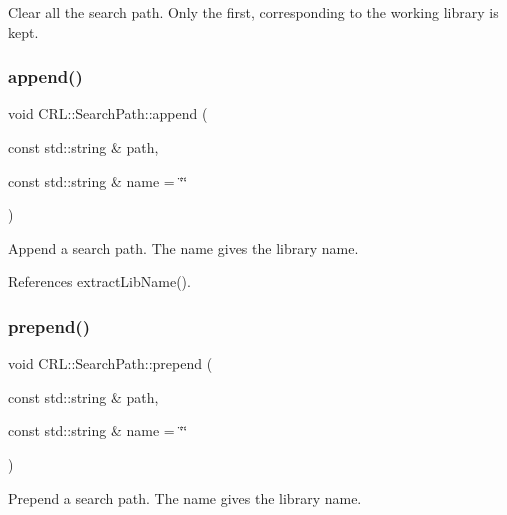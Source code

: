 Clear all the search path. Only the first, corresponding to the working library is kept. \mbox{\label{classCRL_1_1SearchPath_af358bdb1e940f08137f887f70eb641e3}} 
\subsubsection{\texorpdfstring{append()}{append()}}
{\footnotesize\ttfamily void C\+R\+L\+::\+Search\+Path\+::append (\begin{DoxyParamCaption}\item[{const std\+::string \&}]{path,  }\item[{const std\+::string \&}]{name = {\ttfamily \char`\"{}\char`\"{}} }\end{DoxyParamCaption})\hspace{0.3cm}{\ttfamily [inline]}}

Append a search path. The {\ttfamily name} gives the library name. 

References extract\+Lib\+Name().

\mbox{\label{classCRL_1_1SearchPath_af39d78a63d880e90ae6f947abf1fe322}} 
\subsubsection{\texorpdfstring{prepend()}{prepend()}}
{\footnotesize\ttfamily void C\+R\+L\+::\+Search\+Path\+::prepend (\begin{DoxyParamCaption}\item[{const std\+::string \&}]{path,  }\item[{const std\+::string \&}]{name = {\ttfamily \char`\"{}\char`\"{}} }\end{DoxyParamCaption})}

Prepend a search path. The {\ttfamily name} gives the library name. \mbox{\label{classCRL_1_1SearchPath_a6cd1524e1048f246682cd5ef40145d67}} 
